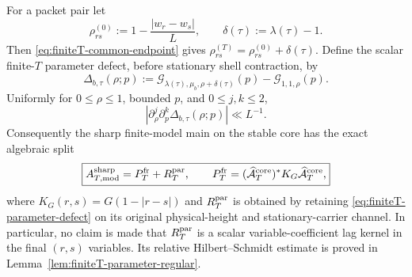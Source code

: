 \begin{proposition}
For a packet pair let
\[
\rho_{rs}^{(0)}:=1-\frac{|w_r-w_s|}{L},
\qquad
\delta(\tau):=\lambda(\tau)-1.
\]
Then \eqref{eq:finiteT-common-endpoint} gives
$\rho_{rs}^{(T)}=\rho_{rs}^{(0)}+\delta(\tau)$.  Define the scalar finite-$T$
parameter defect, before stationary shell contraction, by
\begin{equation}
\boxed{
\Delta_{b,\tau}(\rho;p)
:=\mathscr G_{\lambda(\tau),\mu_b,\rho+\delta(\tau)}(p)
 -\mathscr G_{1,1,\rho}(p).
}
\label{eq:finiteT-parameter-defect}
\end{equation}
Uniformly for $0\le\rho\le1$, bounded $p$, and $0\le j,k\le2$,
\begin{equation}
\boxed{
|\partial_\rho^j\partial_p^k\Delta_{b,\tau}(\rho;p)|\ll L^{-1}.
}
\label{eq:finiteT-parameter-defect-derivatives}
\end{equation}
Consequently the sharp finite-model main on the stable core has the exact
algebraic split
\begin{equation}
\boxed{
A_{T,\rm mod}^{\rm sharp}=P_T^{\rm fr}+R_T^{\rm par},
\qquad
P_T^{\rm fr}
=(\widehat{\mathcal A}_T^{\rm core})^*K_G
 \widehat{\mathcal A}_T^{\rm core},
}
\label{eq:common-core-principal-congruence}
\end{equation}
where $K_G(r,s)=G(1-|r-s|)$ and $R_T^{\rm par}$ is obtained by retaining
\eqref{eq:finiteT-parameter-defect} on its original physical-height and
stationary-carrier channel.  In particular, no claim is made that
$R_T^{\rm par}$ is a scalar variable-coefficient lag kernel in the final
$(r,s)$ variables.  Its relative Hilbert--Schmidt estimate is proved in
Lemma~\ref{lem:finiteT-parameter-regular}.
\end{proposition}

